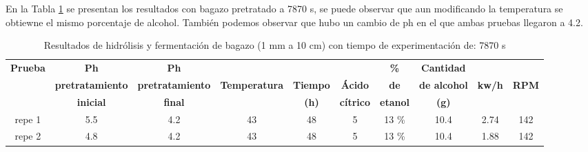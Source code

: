 \documentclass[12pt]{article}
\begin{document}
	
	

	
	
	En la Tabla \ref{hidrolisis alcalino varios 2} se presentan los resultados con bagazo pretratado a 7870 s, se puede observar que aun modificando la temperatura se obtiewne el mismo porcentaje de alcohol. También podemos observar que hubo un cambio de ph en el que ambas pruebas llegaron a 4.2.
	
	
	
		 	\begin{table}[H]
		\centering
		\caption{Resultados de hidrólisis y fermentación de bagazo (1 mm a 10 cm) con tiempo de experimentación de: 7870 s}
		\label{hidrolisis alcalino varios 2}
		\resizebox{16cm}{!} {
			\begin{tabular}{|c|c|c|c|c|c|c|c|c|c|}
				\hline
				\textbf{Prueba}	& \textbf{Ph}& \textbf{Ph} &  &  &  &\textbf{\%} & \textbf{Cantidad} & &\\
				&	\textbf{pretratamiento} & 	\textbf{pretratamiento} & \textbf{Temperatura} & \textbf{Tiempo} & \textbf{Ácido} & \textbf{de } & \textbf{de alcohol } & \textbf{kw/h}& \textbf{RPM}\\
				&	\textbf{inicial}& \textbf{final} &  &\textbf{(h)}  & \textbf{cítrico} & \textbf{etanol }& \textbf{(g) }&& \\ \hline		

				repe 1	&5.5& 4.2 & 43& 48 & 5 & 13 \% &10.4 & 2.74& 142 \\ \hline

				repe 2	&4.8& 4.2 & 43& 48 & 5 & 13 \%  &10.4& 1.88&142 \\ \hline

				
		\end{tabular} }
		
	\end{table}
	
	
	
\end{document}
